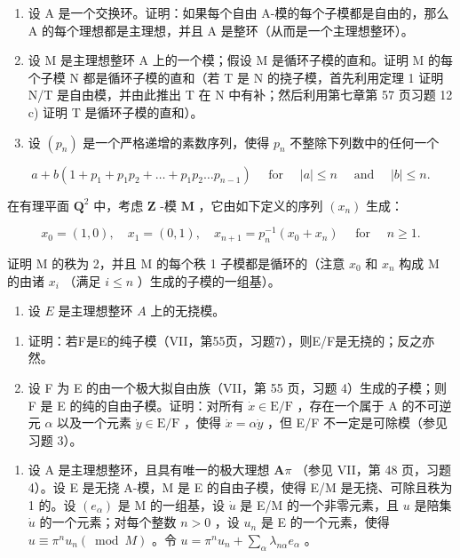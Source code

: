 \BourbakiExerciseGroup

\begin{enumerate}
\def\labelenumi{\arabic{enumi})}
\item
  设 A 是一个交换环。证明：如果每个自由 A-模的每个子模都是自由的，那么 A 的每个理想都是主理想，并且 A 是整环（从而是一个主理想整环）。
\item
  设 M 是主理想整环 A 上的一个模；假设 M 是循环子模的直和。证明 M 的每个子模 N 都是循环子模的直和（若 T 是 N 的挠子模，首先利用定理 1 证明 N/T 是自由模，并由此推出 T 在 N 中有补；然后利用第七章第 57 页习题 12 c) 证明 T 是循环子模的直和）。
\item
  设 \((p_n)\) 是一个严格递增的素数序列，使得 \(p_n\) 不整除下列数中的任何一个
\end{enumerate}

\[
a + b \left(1 + p _ {1} + p _ {1} p _ {2} + \dots + p _ {1} p _ {2} \dots p _ {n - 1}\right) \quad \text { for } \quad | a | \leqslant n \quad \text { and } \quad | b | \leqslant n.
\]

在有理平面 \(\mathbf{Q}^2\) 中，考虑 \(\mathbf{Z}\) -模 \(\mathbf{M}\) ，它由如下定义的序列 \((x_n)\) 生成：

\[
x _ {0} = (1, 0), \quad x _ {1} = (0, 1), \quad x _ {n + 1} = p _ {n} ^ {- 1} \left(x _ {0} + x _ {n}\right) \quad \text { for } \quad n \geqslant 1.
\]

证明 M 的秩为 2，并且 M 的每个秩 1 子模都是循环的（注意 \(x_{0}\) 和 \(x_{n}\) 构成 M 的由诸 \(x_{i}\) （满足 \(i \leqslant n\) ）生成的子模的一组基）。

\begin{enumerate}
\def\labelenumi{\arabic{enumi})}
\setcounter{enumi}{3}
\tightlist
\item
  设 \(E\) 是主理想整环 \(A\) 上的无挠模。
\end{enumerate}

\begin{enumerate}
\def\labelenumi{\alph{enumi})}
\item
  证明：若F是E的纯子模（VII，第55页，习题7），则E/F是无挠的；反之亦然。
\item
  设 F 为 E 的由一个极大拟自由族（VII，第 55 页，习题 4）生成的子模；则 F 是 E 的纯的自由子模。证明：对所有 \(\dot{x} \in \mathrm{E} / \mathrm{F}\) ，存在一个属于 A 的不可逆元 \(\alpha\) 以及一个元素 \(\dot{y} \in \mathrm{E} / \mathrm{F}\) ，使得 \(\dot{x} = \alpha \dot{y}\) ，但 E/F 不一定是可除模（参见习题 3）。
\end{enumerate}

\begin{enumerate}
\def\labelenumi{\arabic{enumi})}
\setcounter{enumi}{4}
\tightlist
\item
  设 A 是主理想整环，且具有唯一的极大理想 \(\mathbf{A}\pi\) （参见 VII，第 48 页，习题 4）。设 E 是无挠 A-模，M 是 E 的自由子模，使得 E/M 是无挠、可除且秩为 1 的。设 \((e_{\alpha})\) 是 M 的一组基，设 \(\dot{u}\) 是 E/M 的一个非零元素，且 \(u\) 是陪集 \(\dot{u}\) 的一个元素；对每个整数 \(n > 0\) ，设 \(u_{n}\) 是 E 的一个元素，使得 \(u \equiv \pi^{n} u_{n} (\bmod M)\) 。令 \(u = \pi^{n} u_{n} + \sum_{\alpha} \lambda_{n\alpha} e_{\alpha}\) 。
\end{enumerate}

